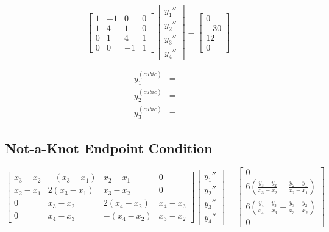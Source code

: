 \documentclass[11pt]{article} %
\begin{document}
$$\begin{bmatrix} 1 & -1 & 0 & 0 \\ 1 & 4 &1 & 0 
		 \\ 0 & 1 & 4 & 1 \\ 0 & 0 & -1 & 1
\end{bmatrix}
\begin{bmatrix} y_1'' \\ y_2'' \\ y_3'' \\ y_4'' \end{bmatrix} = 
\begin{bmatrix} 0 \\ -30 \\ 12 \\ 0\end{bmatrix}$$

$$\begin{array}{lclcl} y^{(cubic)}_1 & = &  \\
		        y^{(cubic)}_2  & = &  \\
		        y^{(cubic)}_3  & = & 
\end{array}$$



\subsection*{Not-a-Knot Endpoint Condition}

$$\begin{bmatrix} x_3 - x_2 & -(x_3- x_1) & x_2 - x_1 & 0 \\ x_2 - x_1 & 2(x_3 - x_1) & x_3 - x_2 & 0 
		 \\ 0 & x_3 - x_2 & 2(x_4 - x_2) & x_4 - x_3 \\ 0 & x_4 - x_3 & -(x_4 - x_2) & x_3 - x_2
\end{bmatrix}
\begin{bmatrix} y_1'' \\ y_2'' \\ y_3'' \\ y_4'' \end{bmatrix} = 
\begin{bmatrix} 0 \\ 6\left( \frac{y_3 - y_2}{x_3 - x_2} - \frac{y_2-y_1}{x_2 - x_1} \right) \\ 
			 6\left( \frac{y_4 - y_3}{x_4 - x_3} - \frac{y_3-y_2}{x_3 - x_2} \right) \\ 0\end{bmatrix}$$
\end{document}
